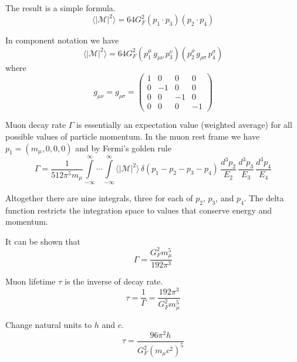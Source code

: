 \documentclass[12pt]{article}
\begin{document}
\noindent
The result is a simple formula.
\begin{equation*}
\langle|\mathcal{M}|^2\rangle=64G_F^2(p_1\cdot p_3)(p_2\cdot p_4)
\tag{1}
\end{equation*}

\noindent
In component notation we have
\begin{equation*}
\langle|\mathcal{M}|^2\rangle=64G_F^2
(p_1^\mu \, g_{\mu\nu} \, p_3^\nu)
(p_2^\rho \, g_{\rho\sigma} \, p_4^\sigma)
\end{equation*}
where
\begin{equation*}
g_{\mu\nu}=g_{\rho\sigma}=\begin{pmatrix}
1 & 0 & 0 & 0\\
0 & -1 & 0 & 0\\
0 & 0 & -1 & 0\\
0 & 0 & 0 & -1
\end{pmatrix}
\end{equation*}

\noindent
Muon decay rate $\Gamma$ is essentially an expectation value (weighted average)
for all possible values of particle momentum.
In the muon rest frame we have $p_1=(m_\mu,0,0,0)$ and by Fermi's golden rule
\begin{equation*}
\Gamma=\frac{1}{512\pi^5m_\mu}
\int\limits_{-\infty}^\infty \cdots \int\limits_{-\infty}^\infty
\langle|\mathcal{M}|^2\rangle
\,\delta(p_1-p_2-p_3-p_4)
\,\frac{d^3p_2}{E_2}\,\frac{d^3p_3}{E_3}\,\frac{d^3p_4}{E_4}
\end{equation*}

\noindent
Altogether there are nine integrals, three for each of $p_2$, $p_3$, and $p_4$.
The delta function restricts the integration space to values that conserve energy and momentum.

\bigskip
\noindent
It can be shown that
\begin{equation*}
\Gamma=\frac{G_F^2 m_\mu^5}{192\pi^3}
\end{equation*}

\noindent
Muon lifetime $\tau$ is the inverse of decay rate.
\begin{equation*}
\tau=\frac{1}{\Gamma}=\frac{192\pi^3}{G_F^2 m_\mu^5}
\end{equation*}

\noindent
Change natural units to $h$ and $c$.
\begin{equation*}
\tau
=\frac{96\pi^2h}{G_F^2\left(m_\mu c^2\right)^5}
\end{equation*}
\end{document}
